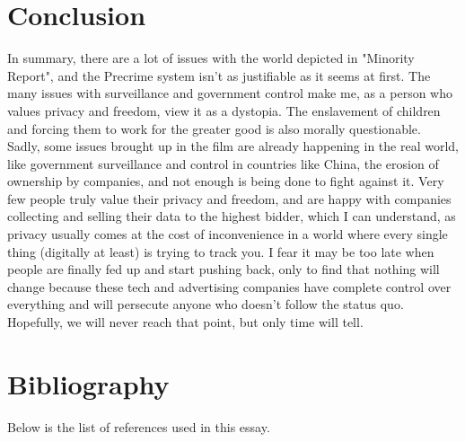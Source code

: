 \documentclass[11pt]{article}
\begin{document}
 \newpage

\section{Conclusion}
\label{sec:org903c212}
In summary, there are a lot of issues with the world depicted
in "Minority Report", and the Precrime system isn't as justifiable
as it seems at first. The many issues with surveillance and
government control make me, as a person who values privacy
and freedom, view it as a dystopia. The enslavement of children
and forcing them to work for the greater good is also morally
questionable.  \\

Sadly, some issues brought up in the film are already
happening in the real world, like government surveillance
and control in countries like China, the erosion of ownership
by companies, and not enough is being done to fight against it.
Very few people truly value their privacy and freedom,
and are happy with companies collecting and selling their data
to the highest bidder, which I can understand, as privacy
usually comes at the cost of inconvenience in a world where
every single thing (digitally at least) is trying to track you.
I fear it may be too late when people are finally fed up and
start pushing back, only to find that nothing will change because
these tech and advertising companies have complete control
over everything and will persecute anyone who doesn't follow
the status quo. Hopefully, we will never reach that point, but
only time will tell.

 \newpage

\section{Bibliography}
\label{sec:orgcb5556b}
Below is the list of references used in this essay.  \\
\end{document}
